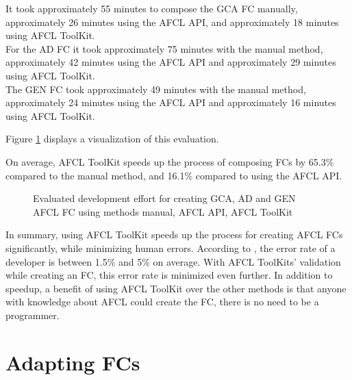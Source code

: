 \documentclass[a4paper,top=25mm,bottom=25mm,12pt,pdftex,halfparskip,twoside,openany,bibtotoc,numbers=noenddot]{scrbook}
\begin{document}
It took approximately 55 minutes to compose the GCA FC manually, approximately 26 minutes using the AFCL API, and approximately 18 minutes using AFCL ToolKit.\\
For the AD FC it took approximately 75 minutes with the manual method, approximately 42 minutes using the AFCL API and approximately 29 minutes using AFCL ToolKit.\\
The GEN FC took approximately 49 minutes with the manual method, approximately 24 minutes using the AFCL API and approximately 16 minutes using AFCL ToolKit.

Figure \ref{fig:evaluation-composing} displays a visualization of this evaluation.

On average, AFCL ToolKit speeds up the process of composing FCs by 65.3\% compared to the manual method, and 16.1\% compared to using the AFCL API.


\begin{figure}[h]
\caption{Evaluated development effort for creating GCA, AD and GEN AFCL FC using methods manual, AFCL API, AFCL ToolKit}
\label{fig:evaluation-composing}
\end{figure}

In summary, using AFCL ToolKit speeds up the process for creating AFCL FCs significantly, while minimizing human errors. According to \cite{books-code-complete-mcconnell}, the error rate of a developer is between 1.5\% and 5\% on average.
With AFCL ToolKits' validation while creating an FC, this error rate is minimized even further.
In addition to speedup, a benefit of using AFCL ToolKit over the other methods is that anyone with knowledge about AFCL could create the FC, there is no need to be a programmer.\\

\section{Adapting FCs}
\label{sec:evaluation-adapting}
\end{document}
